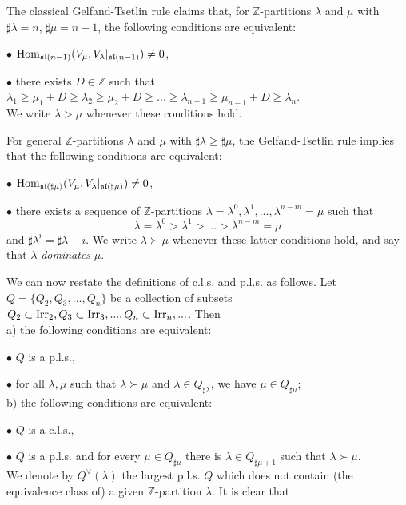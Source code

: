 \documentclass[10pt]{amsart}\oddsidemargin -1mm \evensidemargin -1mm \topmargin -15mm\headheight5mm \headsep 3.5mm \textheight 245mm\textwidth 170mm %
\begin{document}
The classical Gelfand-Tsetlin rule claims that, for $\mathbb Z$-partitions $\lambda$ and $\mu$ with $\sharp\lambda=n$, $\sharp\mu=n-1$, the following conditions are equivalent:

$\bullet$ $\operatorname{\mathrm{Hom}}_{\frak{sl}(n-1)}(V_\mu, V_\lambda|_{\frak{sl}(n-1)})\ne 0$,

$\bullet$ there exists $D\in\mathbb Z$ such that $\lambda_1\ge\mu_1+D\ge\lambda_2\ge\mu_2+D\ge...\ge\lambda_{n-1}\ge\mu_{n-1}+D\ge\lambda_n$.\\
We write $\lambda>\mu$ whenever these conditions hold.

For general $\mathbb Z$-partitions $\lambda$ and $\mu$ with $\sharp\lambda\ge\sharp\mu$, the Gelfand-Tsetlin rule implies that the following conditions are equivalent:

$\bullet$ $\operatorname{\mathrm{Hom}}_{\frak{sl}({\sharp \mu})}(V_\mu, V_\lambda|_{\frak{sl}(\sharp\mu)})\ne 0$,

$\bullet$ there exists a sequence of $\mathbb Z$-partitions $\lambda=\lambda^0, \lambda^1,..., \lambda^{n-m}=\mu$ such that
$$\lambda=\lambda^0>\lambda^1>...>\lambda^{n-m}=\mu$$
and $\sharp \lambda^i=\sharp\lambda-i$. We write $\lambda\succ\mu$ whenever these latter conditions hold, and say that $\lambda$ {\it dominates} $\mu$.

We can now restate the definitions of c.l.s. and p.l.s. as follows.
Let $Q=\{Q_2, Q_3, ..., Q_n\}$ be a collection of subsets $Q_2\subset\operatorname{\mathrm{Irr}}_2, Q_3\subset\operatorname{\mathrm{Irr}}_3,..., Q_n\subset\operatorname{\mathrm{Irr}}_n,...$. Then\\
a) the following conditions are equivalent:

$\bullet$ $Q$ is a p.l.s.,

$\bullet$ for all $\lambda, \mu$ such that $\lambda\succ\mu$ and $\lambda\in Q_{\sharp\lambda}$, we have $\mu\in Q_{\sharp\mu}$;\\
b) the following conditions are equivalent:

$\bullet$ $Q$ is a c.l.s.,

$\bullet$ $Q$ is a p.l.s. and for every $\mu\in Q_{\sharp\mu}$ there is $\lambda\in Q_{\sharp\mu+1}$ such that $\lambda\succ\mu$.\\
We denote by $Q^\vee(\lambda)$ the largest p.l.s. $Q$ which does not contain (the equivalence class of) a given $\mathbb Z$-partition $\lambda$. It is clear that
\end{document}
